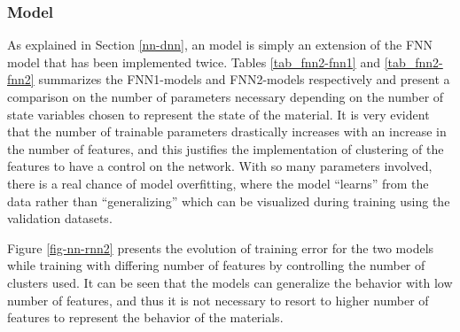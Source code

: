 \subsubsection{\fnn Model} As explained in Section \ref{nn-dnn}, an \fnn model is simply an extension of the FNN model that has been implemented twice. Tables \ref{tab_fnn2-fnn1} and \ref{tab_fnn2-fnn2} summarizes the FNN1-\fnn models and FNN2-\fnn models respectively and present a comparison on the number of parameters necessary depending on the number of state variables chosen to represent the state of the material. It is very evident that the number of trainable parameters drastically increases with an increase in the number of features, and this justifies the implementation of clustering of the features to have a control on the network. With so many parameters involved, there is a real chance of model overfitting, where the model ``learns'' from the data rather than ``generalizing'' which can be visualized during training using the validation datasets.


Figure \ref{fig-nn-rnn2} presents the evolution of training error for the two \fnn models while training with differing number of features by controlling the number of clusters used. It can be seen that the models can generalize the behavior with low number of features, and thus it is not necessary to resort to higher number of features to represent the behavior of the materials.

